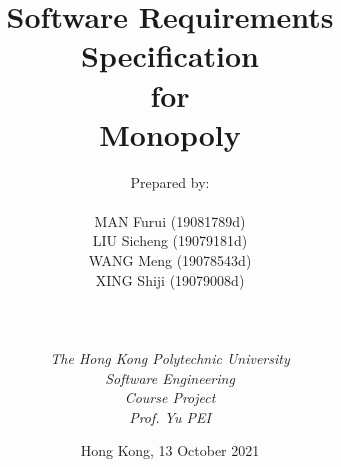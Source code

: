 
\def\Company{Consultancy}
\def\Institute{\textit{The Hong Kong Polytechnic University}}
\def\Course{\textit{Software Engineering}}
\def\Module{\textit{Course Project}}
\def\Docent{\textit{Prof. Yu PEI}}
\def\Assistant{\textit{}}

\def\BoldTitle{Software Requirements Specification}

\def\Subtitle{for \\ Monopoly \\}
\def\Authors{Prepared by:\\\\ MAN Furui (19081789d) \\ LIU Sicheng (19079181d) \\WANG Meng (19078543d) \\XING Shiji (19079008d) \\} 

\title{\textbf{\BoldTitle}\\\Subtitle}
\author{\Authors \\ \\ \\ \Institute\\ \Course\\ \Module\\ \Docent\\ \Assistant}
\date{Hong Kong, 13 October 2021}

